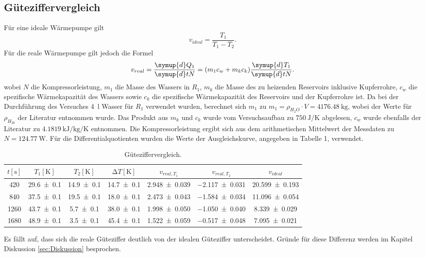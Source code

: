 \subsection{Güteziffervergleich}
Für eine ideale Wärmepumpe gilt
\begin{equation}
  v_{ideal} = \frac{T_1}{T_1-T_2}.
\end{equation}
Für die reale Wärmepumpe gilt jedoch die Formel
\begin{equation}
  v_{real}= \frac{\symup{d} Q_1}{\symup{d} tN} = (m_1c_w+m_kc_k)\frac{\symup{d} T_1}{\symup{d} tN}.
\end{equation}
wobei $ N$ die Kompressorleistung, $ m_1$ die Masse des Wassers in $ R_1 $, $m_k$ die Masse des zu heizenden Reservoirs inklusive Kupferrohre, $ c_w $ die spezifische Wärmekapazität des Wassers sowie $ c_k $ die spezifische Wärmekapazität des Reservoirs und der Kupferrohre ist.
Da bei der Durchführung des Versuches \SI{4}{\litre} Wasser für $R_1$ verwendet wurden, berechnet sich $m_1$ zu $m_1 = \rho_{H_2O} \cdot V = \SI{4176.48}{\kilogram}$, wobei der Werte für $\rho_{H_20}$ der Literatur entnommen wurde.
Das Produkt aus $m_k$ und $c_k$ wurde vom Versuchsaufbau zu $\SI{750}{\joule\per\kelvin}$ abgelesen, $c_w$ wurde ebenfalls der Literatur zu $\SI{4,1819}{\kilo\joule\per\kilogram\per\kelvin}$ entnommen.
Die Kompressorleistung ergibt sich aus dem arithmetischen Mittelwert der Messdaten zu $N=\SI{124.77}{\watt}$.
Für die Differentialquotienten wurden die Werte der Ausgleichskurve, angegeben in Tabelle 1, verwendet.

\begin{table}[H]
  \centering
  \caption{Güteziffervergleich.}
  \label{tab:tabelle2}
\begin{tabular}{c c c c c c c}
  \toprule
  {$t [\si{\second}]$} & {$T_1 [\si{\kelvin}]$} & {$T_2 [\si{\kelvin}]$} & {$\increment{T} [\si{\kelvin}]$} & {$v_{real, T_1}$}  & {$v_{real, T_2}$} & {$v_{ideal}$}\\
  \midrule
  \num{420} & \num{29.6 +- 0.1} & \num{14.9 +- 0.1} & \num{14.7 +- 0.1} & \num{2.948 +- 0.039} & \num{-2.117 +- 0.031} & \num{20.599 +- 0.193} \\
  \num{840} & \num{37.5 +- 0.1} & \num{19.5 +- 0.1} & \num{18.0 +- 0.1} & \num{2.473 +- 0.043} & \num{-1.584 +- 0.034} & \num{11.096 +- 0.054}  \\
  \num{1260} & \num{43.7 +- 0.1} & \num{5.7 +- 0.1} & \num{38.0 +- 0.1} & \num{1.998 +- 0.050} & \num{-1.050 +- 0.040} & \num{8.339 +- 0.029}  \\
  \num{1680} & \num{48.9 +- 0.1} & \num{3.5 +- 0.1} & \num{45.4 +- 0.1} & \num{1.522 +- 0.059} & \num{-0.517 +- 0.048} & \num{7.095 +- 0.021}  \\
  \bottomrule
\end{tabular}
\end{table}
Es fällt auf, dass sich die reale Güteziffer deutlich von der idealen Güteziffer unterscheidet.
Gründe für diese Differenz werden im Kapitel Diskussion \ref{sec:Diskussion} besprochen.
